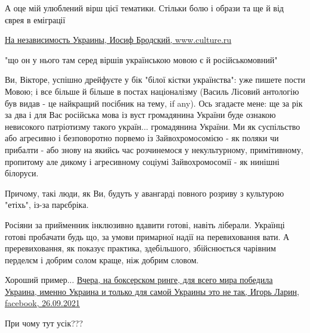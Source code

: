 \begin{itemize}

А оце мій улюблений вірш цієї тематики. Стільки болю і образи та ще й від єврея
в еміграції

\href{https://www.culture.ru/poems/30468/na-nezavisimost-ukrainy}{%
На независимость Украины, Иосиф Бродский, www.culture.ru%
}


"що он у нього там серед віршів українською мовою є й російськомовний"

Ви, Вікторе, успішно дрейфуєте у бік "білої кістки українства": уже пишете
пости Мовою; і все більше й більше в постах націоналізму (Василь Лісовий
антологію був видав - це найкращий посібник на тему, if any). Ось згадаєте
мене: ще за рік за два і для Вас російська мова із вуст громадянина України
буде ознакою невисокого патріотизму такого україн... громадянина України. Ми як
суспільство або агресивно і безповоротно порвемо із Зайвохромосомією - як
поляки чи прибалти - або знову на якийсь час розчинемося у некультурному,
примітивному, пропитому але дикому і агресивному соціумі Зайвохромосомії - як
нинішні білоруси.

Причому, такі люди, як Ви, будуть у авангарді повного розриву з культурою
"етіхь", із-за парєбріка.



Росіяни за прийменник інклюзивно вдавити готові, навіть ліберали. Українці
готові пробачати будь що, за умови примарної надії на перевиховання вати. А
преревиховання, як показує практика, здебільшого, збійснюється чарівним
перделєм і добрим солом краще, ніж добрим словом.

Хороший пример... \href{https://www.facebook.com/100000892405451/posts/4618914334814934/}{%
Вчера, на боксерском ринге, для всего мира победила Украина, именно Украина и только для самой Украины это не так,%
Игорь Ларин, facebook, 26.09.2021%
}

При чому тут усік???

\end{itemize} %
